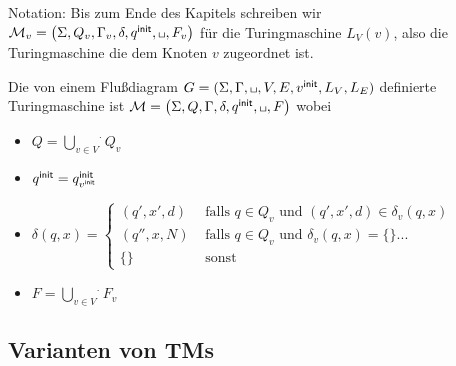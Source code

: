 Notation: Bis zum Ende des Kapitels schreiben wir
$\M_v=\left(\Sigma,Q_v,\Gamma_v,\delta,\qinit,\blank,F_v\right)$
für die Turingmaschine $L_V(v)$, also die Turingmaschine die dem Knoten $v$ zugeordnet ist.

\begin{Def}%
Die von einem Flußdiagram $G=(\Sigma, \Gamma, \blank,V,E,v^\mathsf{init},L_V,L_E)$ definierte Turingmaschine ist 
$\M=\left(\Sigma,Q,\Gamma,\delta,\qinit,\blank,F\right)$ wobei
\begin{itemize}
 \item $Q=\overset{.}{\bigcup\limits_{v\in V}} Q_v$
 \item $q^\mathsf{init} = q^\mathsf{init}_{v^\mathsf{init}}$
 \item $\delta(q,x) = 
 \begin{cases}
 (q',x',d) & \text{ falls } q\in Q_v \text{ und } (q',x',d)\in\delta_v(q,x)\\
 (q'',x,N) & \text{ falls } q\in Q_v \text{ und } \delta_v(q,x)=\{\} ...\\
 \{\} & \text{ sonst }
 \end{cases}$
 \item $F=\overset{.}{\bigcup\limits_{v\in V}} F_v$
\end{itemize}
\end{Def}

\subsection{Varianten von \ac{TM}s}

